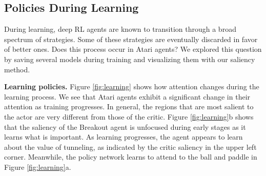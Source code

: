 \documentclass{article}
\begin{document}
\subsection{Policies During Learning}

\begin{figure*}[h!]
\begin{centering}




\caption{Visualizing learning. Frames are chosen from games played by fully-trained agents. Leftmost agents are untrained, rightmost agents are fully trained. Each column is separated by ten million frames of training. White arrows denote the velocity of the ball.}
\label{fig:learning}
\end{centering}
\end{figure*}

During learning, deep RL agents are known to transition through a broad spectrum of strategies. Some of these strategies are eventually discarded in favor of better ones. Does this process occur in Atari agents? We explored this question by saving several models during training and visualizing them with our saliency method.

\textbf{Learning policies.} Figure \ref{fig:learning} shows how attention changes during the learning process. We see that Atari agents exhibit a significant change in their attention as training progresses. In general, the regions that are most salient to the actor are very different from those of the critic. Figure \ref{fig:learning}b shows that the saliency of the Breakout agent is unfocused during early stages as it learns what is important. As learning progresses, the agent appears to learn about the value of tunneling, as indicated by the critic saliency in the upper left corner. Meanwhile, the policy network learns to attend to the ball and paddle in Figure \ref{fig:learning}a.
\end{document}
